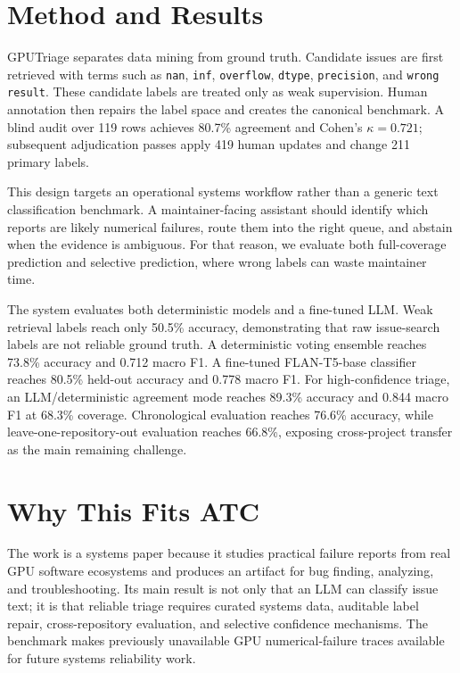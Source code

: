 \documentclass[sigplan,10pt]{acmart}
\newcommand{\system}{GPUTriage}
\begin{document}
\section{Method and Results}

\system{} separates data mining from ground truth. Candidate issues are first
retrieved with terms such as \texttt{nan}, \texttt{inf}, \texttt{overflow},
\texttt{dtype}, \texttt{precision}, and \texttt{wrong result}. These candidate
labels are treated only as weak supervision. Human annotation then repairs the
label space and creates the canonical benchmark. A blind audit over 119 rows
achieves 80.7\% agreement and Cohen's $\kappa=0.721$; subsequent adjudication
passes apply 419 human updates and change 211 primary labels.

This design targets an operational systems workflow rather than a generic text
classification benchmark. A maintainer-facing assistant should identify which
reports are likely numerical failures, route them into the right queue, and
abstain when the evidence is ambiguous. For that reason, we evaluate both
full-coverage prediction and selective prediction, where wrong labels can waste
maintainer time.

The system evaluates both deterministic models and a fine-tuned LLM. Weak
retrieval labels reach only 50.5\% accuracy, demonstrating that raw
issue-search labels are not reliable ground truth. A deterministic voting
ensemble reaches 73.8\% accuracy and 0.712 macro F1. A fine-tuned FLAN-T5-base
classifier reaches 80.5\% held-out accuracy and 0.778 macro F1. For
high-confidence triage, an LLM/deterministic agreement mode reaches 89.3\%
accuracy and 0.844 macro F1 at 68.3\% coverage. Chronological evaluation
reaches 76.6\% accuracy, while leave-one-repository-out evaluation reaches
66.8\%, exposing cross-project transfer as the main remaining challenge.

\section{Why This Fits ATC}

The work is a systems paper because it studies practical failure reports from
real GPU software ecosystems and produces an artifact for bug finding,
analyzing, and troubleshooting. Its main result is not only that an LLM can
classify issue text; it is that reliable triage requires curated systems data,
auditable label repair, cross-repository evaluation, and selective confidence
mechanisms. The benchmark makes previously unavailable GPU numerical-failure
traces available for future systems reliability work.
\end{document}
